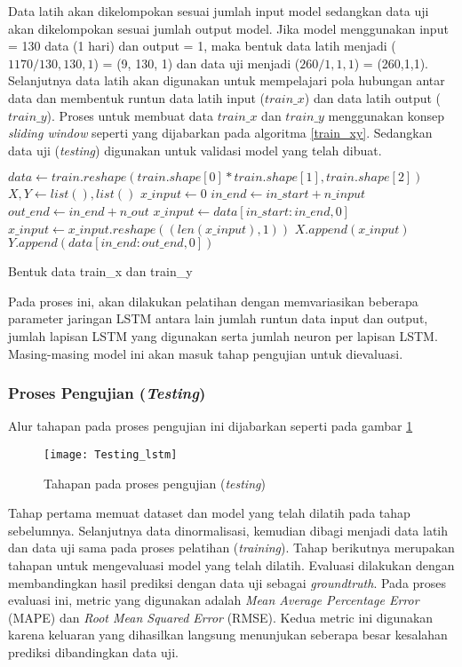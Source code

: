 \documentclass[../thesis.tex]{subfiles}
\begin{document}
Data latih akan dikelompokan sesuai jumlah input model sedangkan data uji akan dikelompokan sesuai jumlah output model. Jika model menggunakan input = 130 data (1 hari) dan output = 1, maka bentuk data latih menjadi ($1170/130, 130, 1$) = (9, 130, 1) dan data uji menjadi ($260/1, 1, 1$) = (260,1,1).
Selanjutnya data latih akan digunakan untuk mempelajari pola hubungan antar data dan membentuk runtun data latih input ($train\_x$) dan data latih output ($train\_y$). Proses untuk membuat data $train\_x$ dan $train\_y$ menggunakan konsep \textit{sliding window} seperti yang dijabarkan pada algoritma \ref{train_xy}. Sedangkan data uji (\textit{testing}) digunakan untuk validasi model yang telah dibuat.
\begin{algorithm}[htp]
	\begin{algorithmic}[1]
		\State $data \leftarrow train.reshape(train.shape[0]*train.shape[1], train.shape[2])$
		\State $X, Y \leftarrow list(), list()$
		\State $x\_input \leftarrow 0$
			\State $in\_end \leftarrow in\_start + n\_input$
			\State $out\_end \leftarrow in\_end + n\_out$
				\State $x\_input \leftarrow data[in\_start: in\_end, 0]$
				\State $x\_input \leftarrow x\_input.reshape((len(x\_input), 1))$
				\State $X.append(x\_input)$
				\State $Y.append(data[in\_end:out\_end, 0])$
			\EndIf
		\EndFor
	\EndFunction
	\end{algorithmic}
	\caption{Bentuk data train_x dan train_y}
	\label{train_xy}
\end{algorithm}
	
Pada proses ini, akan dilakukan pelatihan dengan memvariasikan beberapa parameter jaringan LSTM antara lain jumlah runtun data input dan output, jumlah lapisan LSTM yang digunakan serta jumlah neuron per lapisan LSTM. 
Masing-masing model ini akan masuk tahap pengujian untuk dievaluasi.

\subsubsection{Proses Pengujian (\textit{Testing})}
Alur tahapan pada proses pengujian ini dijabarkan seperti pada gambar \ref{lstm_testing}
\begin{figure}[t]
	\centering
	\texttt{[image: Testing\_lstm]}
	\caption{Tahapan pada proses pengujian (\textit{testing})}
	\label{lstm_testing}
\end{figure}
Tahap pertama memuat dataset dan model yang telah dilatih pada tahap sebelumnya. Selanjutnya data dinormalisasi, kemudian dibagi menjadi data latih dan data uji sama pada proses pelatihan (\textit{training}).
Tahap berikutnya merupakan tahapan untuk mengevaluasi model yang telah dilatih. Evaluasi dilakukan dengan membandingkan hasil prediksi dengan data uji sebagai \textit{groundtruth}. Pada proses evaluasi ini, metric yang digunakan adalah \textit{Mean Average Percentage Error} (MAPE) dan \textit{Root Mean Squared Error} (RMSE). Kedua metric ini digunakan karena keluaran yang dihasilkan langsung menunjukan seberapa besar kesalahan prediksi dibandingkan data uji. 
\end{document}
